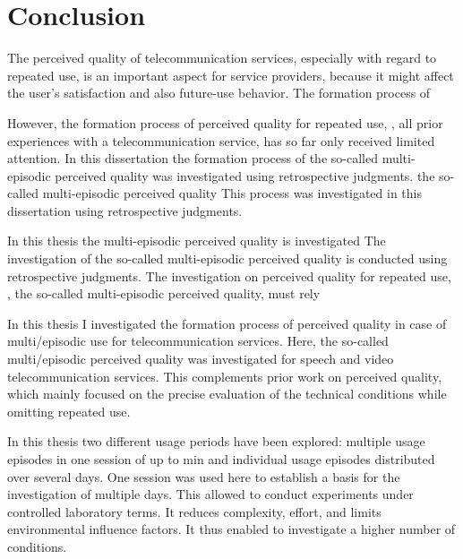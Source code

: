 \chapter{Conclusion}\label{chap:discussion}
The perceived quality of telecommunication services, especially with regard to repeated use, is an important aspect for service providers, because it might affect the user's satisfaction and also future-use behavior.
The formation process of  


However, the formation process of perceived quality for repeated use, \ie, all prior experiences with a telecommunication service, has so far only received limited attention.
In this dissertation the formation process of the so-called multi-episodic perceived quality was investigated using retrospective judgments.
the so-called multi-episodic perceived quality
This process was investigated in this dissertation using retrospective judgments.

In this thesis the multi-episodic perceived quality is investigated
The investigation of the so-called multi-episodic perceived quality is conducted using retrospective judgments.
The investigation on perceived quality for repeated use, \ie, the so-called multi-episodic perceived quality, must rely 



In this thesis I investigated the formation process of perceived quality in case of multi\-/episodic use for telecommunication services.
Here, the so-called multi\-/episodic perceived quality was investigated for speech and video telecommunication services.
This complements prior work on perceived quality, which mainly focused on the precise evaluation of the technical conditions while omitting repeated use.



















In this thesis two different usage periods have been explored: multiple usage episodes in one session of up to \unit[45]{min} and individual usage episodes distributed over several days.
One session was used here to establish a basis for the investigation of multiple days.
This allowed to conduct experiments under controlled laboratory terms.
It reduces complexity, effort, and limits environmental influence factors.
It thus enabled to investigate a higher number of conditions.

